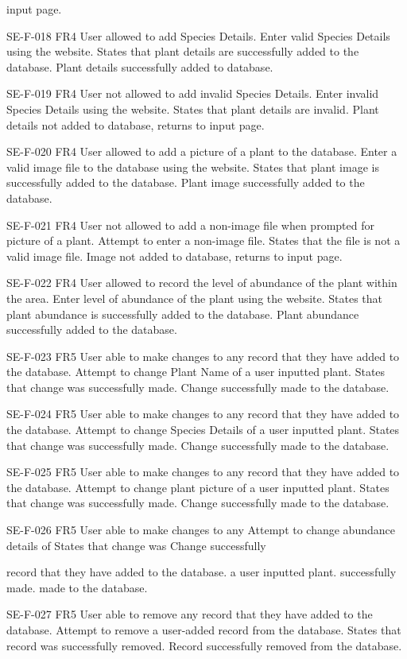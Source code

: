 input page.

SE-F-018 FR4 User allowed to add Species Details. Enter valid Species Details using the website. States that plant details are successfully added to the database. Plant details successfully added to database.

SE-F-019 FR4 User not allowed to add invalid Species Details. Enter invalid Species Details using the website. States that plant details are invalid. Plant details not added to database, returns to input page.

SE-F-020 FR4 User allowed to add a picture of a plant to the database. Enter a valid image file to the database using the website. States that plant image is successfully added to the database. Plant image successfully added to the database.

SE-F-021 FR4 User not allowed to add a non-image file when prompted for picture of a plant. Attempt to enter a non-image file. States that the file is not a valid image file. Image not added to database, returns to input page.

SE-F-022 FR4 User allowed to record the level of abundance of the plant within the area. Enter level of abundance of the plant using the website. States that plant abundance is successfully added to the database. Plant abundance successfully added to the database.

SE-F-023 FR5 User able to make changes to any record that they have added to the database. Attempt to change Plant Name of a user inputted plant. States that change was successfully made. Change successfully made to the database.

SE-F-024 FR5 User able to make changes to any record that they have added to the database. Attempt to change Species Details of a user inputted plant. States that change was successfully made. Change successfully made to the database.

SE-F-025 FR5 User able to make changes to any record that they have added to the database. Attempt to change plant picture of a user inputted plant. States that change was successfully made. Change successfully made to the database.

SE-F-026 FR5 User able to make changes to any Attempt to change abundance details of States that change was Change successfully

record that they have added to the database. a user inputted plant. successfully made. made to the database.

SE-F-027 FR5 User able to remove any record that they have added to the database. Attempt to remove a user-added record from the database. States that record was successfully removed. Record successfully removed from the database.

